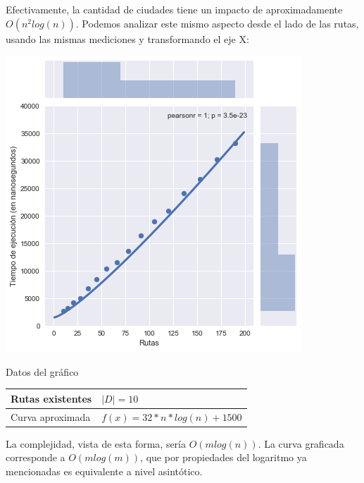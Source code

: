 Efectivamente, la cantidad de ciudades tiene un impacto de aproximadamente $O(n^2log(n))$. Podemos analizar este mismo aspecto desde el lado de las rutas, usando las mismas mediciones y transformando el eje X:

\noindent
\begin{minipage}{0.55\textwidth}
	\hfill
	\includegraphics[scale=0.60]{imagenes/ej3-1-bis.png}
\end{minipage}
\hfill
\begin{minipage}{0.44\textwidth}
	\begin{center}
		Datos del gráfico

		\begin{tabular}{ | l l |}
			\hline
			Rutas existentes & $| D | = 10$ \\ \hline
			Curva aproximada & $f(x) = 32 * n * log(n) + 1500$ \\
			\hline
		\end{tabular}
	\end{center}
\end{minipage}

La complejidad, vista de esta forma, sería $O(m log(n))$. La curva graficada corresponde a $O(m log(m))$, que por propiedades del logaritmo ya mencionadas es equivalente a nivel asintótico.

